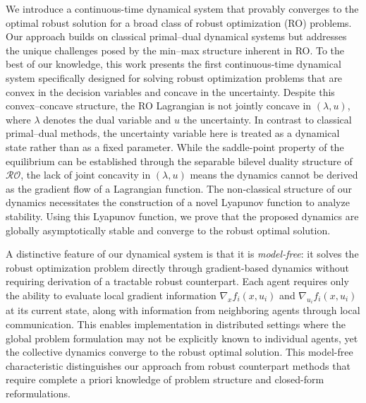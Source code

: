 \documentclass[journal,twoside,web]{ieeecolor}
\newcommand{\rev}[1]{#1}
\begin{document}
\rev{We introduce a continuous-time dynamical system that provably converges to the optimal robust solution for a broad class of robust optimization (RO) problems. Our approach builds on classical primal--dual dynamical systems \cite{arrow1958,feijer2010} but addresses the unique challenges posed by the min--max structure inherent in RO. To the best of our knowledge, this work presents the first continuous-time dynamical system specifically designed for solving robust optimization problems that are convex in the decision variables and concave in the uncertainty. Despite this convex--concave structure, the RO Lagrangian is not jointly concave in $(\lambda,u)$, where $\lambda$ denotes the dual variable and $u$ the uncertainty. In contrast to classical primal--dual methods, the uncertainty variable here is treated as a dynamical state rather than as a fixed parameter. While the saddle-point property of the equilibrium can be established through the separable bilevel duality structure of $\mathcal{RO}$, the lack of joint concavity in $(\lambda,u)$ means the dynamics cannot be derived as the gradient flow of a Lagrangian function. The non-classical structure of our dynamics necessitates the construction of a novel Lyapunov function to analyze stability. Using this Lyapunov function, we prove that the proposed dynamics are globally asymptotically stable and converge to the robust optimal solution.
}


\rev{A distinctive feature of our dynamical system is that it is \emph{model-free}: it solves the robust optimization problem directly through gradient-based dynamics without requiring derivation of a tractable robust counterpart. Each agent requires only the ability to evaluate local gradient information $\nabla_x f_i(x,u_i)$ and $\nabla_{u_i} f_i(x,u_i)$ at its current state, along with information from neighboring agents through local communication. This enables implementation in distributed settings where the global problem formulation may not be explicitly known to individual agents, yet the collective dynamics converge to the robust optimal solution. This model-free characteristic distinguishes our approach from robust counterpart methods that require complete a priori knowledge of problem structure and closed-form reformulations.}





\end{document}
